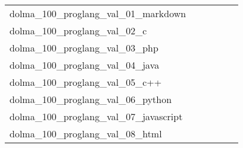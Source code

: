 {\begin{longtable}{m{6cm}m{1.7cm}m{1.7cm}m{1.7cm}m{1.7cm}m{1.7cm}}
	dolma\_100\_proglang\_val\_01\_markdown  & \colorbox[HTML]{ccea9c}{\makebox[\mywidth][c]{3.16}} & \colorbox[HTML]{d0ec9e}{\makebox[\mywidth][c]{3.16}} & \colorbox[HTML]{ffffe5}{\makebox[\mywidth][c]{3.56}} & \colorbox[HTML]{bde395}{\makebox[\mywidth][c]{3.15}} & \colorbox[HTML]{77c578}{\makebox[\mywidth][c]{3.11}}\\
	dolma\_100\_proglang\_val\_02\_c  & \colorbox[HTML]{77c578}{\makebox[\mywidth][c]{1.84}} & \colorbox[HTML]{ebf7b0}{\makebox[\mywidth][c]{1.91}} & \colorbox[HTML]{ffffe5}{\makebox[\mywidth][c]{2.23}} & \colorbox[HTML]{b8e293}{\makebox[\mywidth][c]{1.86}} & \colorbox[HTML]{9dd687}{\makebox[\mywidth][c]{1.85}}\\
	dolma\_100\_proglang\_val\_03\_php  & \colorbox[HTML]{f3fab6}{\makebox[\mywidth][c]{1.75}} & \colorbox[HTML]{f7fcba}{\makebox[\mywidth][c]{1.75}} & \colorbox[HTML]{ffffe5}{\makebox[\mywidth][c]{1.83}} & \colorbox[HTML]{b4e091}{\makebox[\mywidth][c]{1.73}} & \colorbox[HTML]{77c578}{\makebox[\mywidth][c]{1.72}}\\
	dolma\_100\_proglang\_val\_04\_java  & \colorbox[HTML]{a9db8c}{\makebox[\mywidth][c]{1.96}} & \colorbox[HTML]{e2f3a9}{\makebox[\mywidth][c]{1.99}} & \colorbox[HTML]{ffffe5}{\makebox[\mywidth][c]{2.18}} & \colorbox[HTML]{77c578}{\makebox[\mywidth][c]{1.95}} & \colorbox[HTML]{7ac779}{\makebox[\mywidth][c]{1.95}}\\
	dolma\_100\_proglang\_val\_05\_c++  & \colorbox[HTML]{77c578}{\makebox[\mywidth][c]{2.19}} & \colorbox[HTML]{e8f6ae}{\makebox[\mywidth][c]{2.25}} & \colorbox[HTML]{ffffe5}{\makebox[\mywidth][c]{2.53}} & \colorbox[HTML]{afdd8f}{\makebox[\mywidth][c]{2.21}} & \colorbox[HTML]{89cd7f}{\makebox[\mywidth][c]{2.19}}\\
	dolma\_100\_proglang\_val\_06\_python  & \colorbox[HTML]{96d385}{\makebox[\mywidth][c]{2.35}} & \colorbox[HTML]{e4f4ab}{\makebox[\mywidth][c]{2.39}} & \colorbox[HTML]{ffffe5}{\makebox[\mywidth][c]{2.62}} & \colorbox[HTML]{addd8e}{\makebox[\mywidth][c]{2.36}} & \colorbox[HTML]{77c578}{\makebox[\mywidth][c]{2.34}}\\
	dolma\_100\_proglang\_val\_07\_javascript  & \colorbox[HTML]{9fd688}{\makebox[\mywidth][c]{2.54}} & \colorbox[HTML]{ebf7b0}{\makebox[\mywidth][c]{2.59}} & \colorbox[HTML]{ffffe5}{\makebox[\mywidth][c]{2.83}} & \colorbox[HTML]{77c578}{\makebox[\mywidth][c]{2.53}} & \colorbox[HTML]{78c679}{\makebox[\mywidth][c]{2.53}}\\
	dolma\_100\_proglang\_val\_08\_html  & \colorbox[HTML]{9dd687}{\makebox[\mywidth][c]{1.92}} & \colorbox[HTML]{d8efa2}{\makebox[\mywidth][c]{1.94}} & \colorbox[HTML]{ffffe5}{\makebox[\mywidth][c]{2.13}} & \colorbox[HTML]{8ccf81}{\makebox[\mywidth][c]{1.91}} & \colorbox[HTML]{77c578}{\makebox[\mywidth][c]{1.91}}\\

\end{longtable}}
